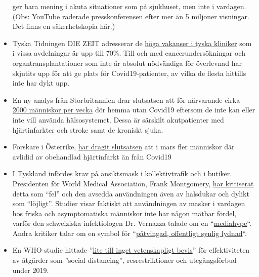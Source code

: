 \begin{itemize}
  ger bara mening i akuta situationer som på sjukhuset, men inte i
  vardagen. (Obs: YouTube raderade presskonferensen efter mer än 5
  miljoner visningar. Det finns en säkerhetskopia här.)
\item
  Tyska Tidningen DIE ZEIT adresserar de
  \href{https://www.zeit.de/2020/18/kliniken-coronavirus-intensivbetten-patienten-behandlung-notaufnahme}{höga
  vakanser i tyska kliniker} som i vissa avdelningar är upp till 70\%.
  Till och med cancerundersökningar och organtransplantationer som inte
  är absolut nödvändiga för överlevnad har skjutits upp för att ge plats
  för Covid19-patienter, av vilka de flesta hittills inte har dykt upp.
\item
  En ny analys från Storbritannien drar slutsatsen att för närvarande
  cirka
  \href{https://www.telegraph.co.uk/global-health/science-and-disease/two-new-waves-deaths-break-nhs-new-analysis-warns/}{2000
  människor per vecka} dör hemma utan Covid19 eftersom de inte kan eller
  inte vill använda hälsosystemet. Dessa är särskilt akutpatienter med
  hjärtinfarkter och stroke samt de kroniskt sjuka.
\item
  Forskare i Österrike,
  \href{https://academic.oup.com/eurheartj/advance-article/doi/10.1093/eurheartj/ehaa314/5820829}{har
  dragit slutsatsen} att i mars fler människor där avlidid av obehandlad
  hjärtinfarkt än från Covid19
\item
  I Tyskland infördes krav på ansiktsmask i kollektivtrafik och i
  butiker. Presidenten för World Medical Association, Frank Montgomery,
  \href{https://www.aerztezeitung.de/Politik/Montgomery-haelt-Maskenpflicht-fuer-falsch-408844.html}{har
  kritiserat} detta som ``fel'' och den avsedda användningen även av
  halsdukar och dylikt som ``löjligt''. Studier visar faktiskt att
  användningen av masker i vardagen hos friska och asymptomatiska
  människor inte har någon mätbar fördel, varför den schweiziska
  infektiologen Dr. Vernazza talade om en
  ``\href{https://infekt.ch/2020/04/atemschutzmasken-fuer-alle-medienhype-oder-unverzichtbar/}{mediahype}``.
  Andra kritiker talar om en symbol för
  ``\href{https://multipolar-magazin.de/artikel/maskenpflicht-gesellschaftliches-klima}{påtvingad,
  offentligt synlig lydnad}``.
\item
  En WHO-studie hittade
  ''\href{https://www.heise.de/tp/features/COVID-19-WHO-Studie-findet-kaum-Belege-fuer-die-Wirksamkeit-von-Eindaemmungsmassnahmen-4706446.html}{lite
  till inget vetenskapligt bevis}'' för effektiviteten av åtgärder som
  ''social distancing'', resrestriktioner och utegångsförbud under 2019.

\end{itemize}
